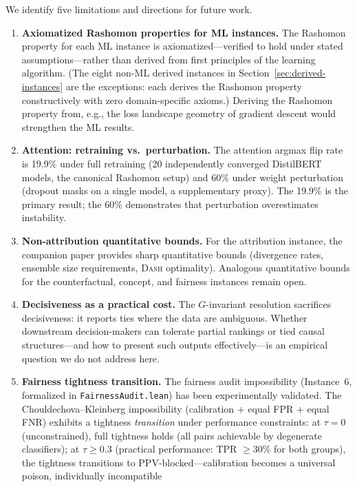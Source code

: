 \documentclass[11pt,a4paper]{article}
\newcommand{\DASH}{\textsc{Dash}}
\begin{document}
We identify five limitations and directions for future work.
\begin{enumerate}[label=(\arabic*)]
  \item \textbf{Axiomatized Rashomon properties for ML instances.}  The
    Rashomon property for each ML instance is axiomatized---verified to hold
    under stated assumptions---rather than derived from first principles of the
    learning algorithm.  (The eight non-ML derived instances in
    Section~\ref{sec:derived-instances} are the exceptions: each derives the
    Rashomon property constructively with zero domain-specific axioms.)  Deriving the Rashomon
    property from, e.g., the loss landscape geometry of gradient descent would
    strengthen the ML results.
  \item \textbf{Attention: retraining vs.\ perturbation.}  The attention
    argmax flip rate is 19.9\% under full retraining (20 independently
    converged DistilBERT models, the canonical Rashomon setup) and 60\%
    under weight perturbation (dropout masks on a single model, a
    supplementary proxy).  The 19.9\% is the primary result; the 60\%
    demonstrates that perturbation overestimates instability.
  \item \textbf{Non-attribution quantitative bounds.}  For the attribution
    instance, the companion paper provides sharp quantitative bounds (divergence
    rates, ensemble size requirements, \DASH{} optimality).  Analogous
    quantitative bounds for the counterfactual, concept, and fairness instances
    remain open.
  \item \textbf{Decisiveness as a practical cost.}  The $G$-invariant
    resolution sacrifices decisiveness: it reports ties where the data are
    ambiguous.  Whether downstream decision-makers can tolerate partial rankings
    or tied causal structures---and how to present such outputs
    effectively---is an empirical question we do not address here.
  \item \textbf{Fairness tightness transition.}  The fairness
    audit impossibility (Instance~6, formalized in \texttt{FairnessAudit.lean})
    has been experimentally validated.  The Chouldechova--Kleinberg impossibility
    (calibration $+$ equal FPR $+$ equal FNR) exhibits a tightness \emph{transition}
    under performance constraints: at $\tau = 0$ (unconstrained), full tightness holds
    (all pairs achievable by degenerate classifiers); at $\tau \geq 0.3$ (practical
    performance: TPR $\geq 30\%$ for both groups), the tightness transitions to
    PPV-blocked---calibration becomes a universal poison, individually incompatible

\end{enumerate}
\end{document}
